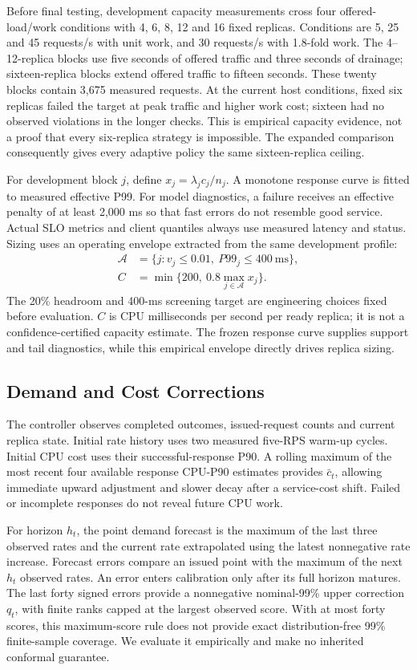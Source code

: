 \documentclass[10pt,twocolumn,a4paper]{article}
\begin{document}
Before final testing, development capacity measurements cross four offered-load/work conditions with 4, 6, 8, 12 and 16 fixed replicas. Conditions are 5, 25 and 45 requests/s with unit work, and 30 requests/s with 1.8-fold work. The 4--12-replica blocks use five seconds of offered traffic and three seconds of drainage; sixteen-replica blocks extend offered traffic to fifteen seconds. These twenty blocks contain 3,675 measured requests. At the current host conditions, fixed six replicas failed the target at peak traffic and higher work cost; sixteen had no observed violations in the longer checks. This is empirical capacity evidence, not a proof that every six-replica strategy is impossible. The expanded comparison consequently gives every adaptive policy the same sixteen-replica ceiling.

For development block $j$, define $x_j=\lambda_jc_j/n_j$. A monotone response curve is fitted to measured effective P99. For model diagnostics, a failure receives an effective penalty of at least 2,000 ms so that fast errors do not resemble good service. Actual SLO metrics and client quantiles always use measured latency and status. Sizing uses an operating envelope extracted from the same development profile:
\begin{align}
\mathcal A&=\{j:v_j\leq0.01,\ P99_j\leq400\mathrm{\ ms}\},\\
C&=\min\{200,\ 0.8\max_{j\in\mathcal A}x_j\}.\label{eq:capacity}
\end{align}
The 20\% headroom and 400-ms screening target are engineering choices fixed before evaluation. $C$ is CPU milliseconds per second per ready replica; it is not a confidence-certified capacity estimate. The frozen response curve supplies support and tail diagnostics, while this empirical envelope directly drives replica sizing.

\subsection{Demand and Cost Corrections}
The controller observes completed outcomes, issued-request counts and current replica state. Initial rate history uses two measured five-RPS warm-up cycles. Initial CPU cost uses their successful-response P90. A rolling maximum of the most recent four available response CPU-P90 estimates provides $\bar c_t$, allowing immediate upward adjustment and slower decay after a service-cost shift. Failed or incomplete responses do not reveal future CPU work.

For horizon $h_t$, the point demand forecast is the maximum of the last three observed rates and the current rate extrapolated using the latest nonnegative rate increase. Forecast errors compare an issued point with the maximum of the next $h_t$ observed rates. An error enters calibration only after its full horizon matures. The last forty signed errors provide a nonnegative nominal-99\% upper correction $q_t$, with finite ranks capped at the largest observed score. With at most forty scores, this maximum-score rule does not provide exact distribution-free 99\% finite-sample coverage. We evaluate it empirically and make no inherited conformal guarantee.
\end{document}
